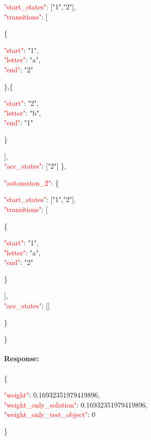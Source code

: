     \begin{adjustwidth}{7.5 mm}{0 cm}
     \begin{adjustwidth}{7.5 mm}{0 cm}
        \textcolor{red}{"start\_states"}: ["1","2"], \\
        \textcolor{red}{"transitions"}: [
        \begin{adjustwidth}{7.5 mm}{0 cm}
          \{
            \begin{adjustwidth}{7.5 mm}{0 cm}
            \textcolor{red}{"start"}: "1", \\
            \textcolor{red}{"letter"}: "a", \\
            \textcolor{red}{"end"}: "2" 
            \end{adjustwidth}
          \},\{ 
            \begin{adjustwidth}{7.5 mm}{0 cm}
            \textcolor{red}{"start"}: "2",\\
            \textcolor{red}{"letter"}: "b", \\
            \textcolor{red}{"end"}: "1"
            \end{adjustwidth}
          \}
        \end{adjustwidth}
        ],\\
        \textcolor{red}{"acc\_states"}: ["2"]
        \},
    \end{adjustwidth}
  \textcolor{red}{"automaton\_2"}: \{
  \begin{adjustwidth}{7.5 mm}{0 cm}
    \textcolor{red}{"start\_states"}: ["1","2"], \\
    \textcolor{red}{"transitions"}: [
    \begin{adjustwidth}{7.5 mm}{0 cm}
      \{
        \begin{adjustwidth}{7.5 mm}{0 cm}
        \textcolor{red}{"start"}: "1",\\
        \textcolor{red}{"letter"}: "a",\\
        \textcolor{red}{"end"}: "2"
        \end{adjustwidth}
      \}\\
      \end{adjustwidth}
    ],\\
    \textcolor{red}{"acc\_states"}: []
    \end{adjustwidth}
  \}
  \end{adjustwidth}
     \} \\
\ \\
\textbf{Response:}\\
\ \\
\{  
    \begin{adjustwidth}{7.5 mm}{0 cm}
    \textcolor{red}{"weight"}: 0.16932351979419896, \\
    \textcolor{red}{"weight\_only\_solution"}: 0.16932351979419896,\\
    \textcolor{red}{"weight\_only\_test\_object"}: 0
    \end{adjustwidth}
\}

